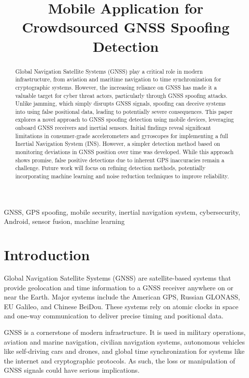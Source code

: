 \documentclass[conference]{IEEEtran}
\title{Mobile Application for Crowdsourced GNSS Spoofing Detection}
\author{
 \IEEEauthorblockN{Nathan Johnson}
 \IEEEauthorblockA{
    Cyber Intelligence and Security Department\\
    Embry-Riddle Aeronautical University\\
    Prescott, Arizona, USA\\
    johnsn63@my.erau.edu
  }
}
\begin{document}
\maketitle

\begin{abstract}
Global Navigation Satellite Systems (GNSS) play a critical role in modern infrastructure, from aviation and maritime navigation to time synchronization for cryptographic systems. However, the increasing reliance on GNSS has made it a valuable target for cyber threat actors, particularly through GNSS spoofing attacks. Unlike jamming, which simply disrupts GNSS signals, spoofing can deceive systems into using false positional data, leading to potentially severe consequences. This paper explores a novel approach to GNSS spoofing detection using mobile devices, leveraging onboard GNSS receivers and inertial sensors. Initial findings reveal significant limitations in consumer-grade accelerometers and gyroscopes for implementing a full Inertial Navigation System (INS). However, a simpler detection method based on monitoring deviations in GNSS position over time was developed. While this approach shows promise, false positive detections due to inherent GPS inaccuracies remain a challenge. Future work will focus on refining detection methods, potentially incorporating machine learning and noise reduction techniques to improve reliability.
\end{abstract}

\begin{IEEEkeywords}
GNSS, GPS spoofing, mobile security, inertial navigation system, cybersecurity, Android, sensor fusion, machine learning
\end{IEEEkeywords}

\section{Introduction}
Global Navigation Satellite Systems (GNSS) are satellite-based systems that provide geolocation and time information to a GNSS receiver anywhere on or near the Earth. Major systems include the American GPS, Russian GLONASS, EU Galileo, and Chinese BeiDou. These systems rely on atomic clocks in space and one-way communication to deliver precise timing and positional data.

GNSS is a cornerstone of modern infrastructure. It is used in military operations, aviation and marine navigation, civilian navigation systems, autonomous vehicles like self-driving cars and drones, and global time synchronization for systems like the internet and cryptographic protocols\cite{lu2021}. As such, the loss or manipulation of GNSS signals could have serious implications.
\end{document}
